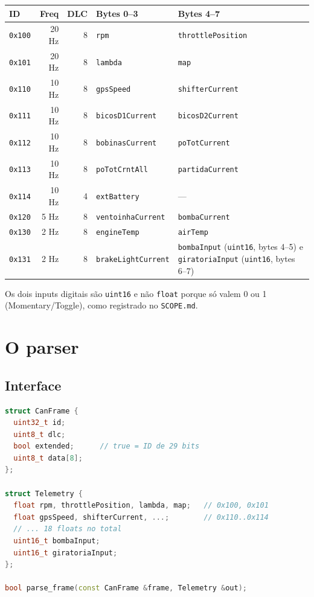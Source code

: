 \documentclass[11pt,a4paper]{article}
\begin{document}
\begin{center}
\small
\begin{tabularx}{\textwidth}{lrrXX}
\toprule
\textbf{ID} & \textbf{Freq} & \textbf{DLC} & \textbf{Bytes 0--3} & \textbf{Bytes 4--7} \\
\midrule
\texttt{0x100} & 20 Hz & 8 & \texttt{rpm} & \texttt{throttlePosition} \\
\texttt{0x101} & 20 Hz & 8 & \texttt{lambda} & \texttt{map} \\
\texttt{0x110} & 10 Hz & 8 & \texttt{gpsSpeed} & \texttt{shifterCurrent} \\
\texttt{0x111} & 10 Hz & 8 & \texttt{bicosD1Current} & \texttt{bicosD2Current} \\
\texttt{0x112} & 10 Hz & 8 & \texttt{bobinasCurrent} & \texttt{poTotCurrent} \\
\texttt{0x113} & 10 Hz & 8 & \texttt{poTotCrntAll} & \texttt{partidaCurrent} \\
\texttt{0x114} & 10 Hz & 4 & \texttt{extBattery} & --- \\
\texttt{0x120} & 5 Hz & 8 & \texttt{ventoinhaCurrent} & \texttt{bombaCurrent} \\
\texttt{0x130} & 2 Hz & 8 & \texttt{engineTemp} & \texttt{airTemp} \\
\texttt{0x131} & 2 Hz & 8 & \texttt{brakeLightCurrent} & \texttt{bombaInput} (\texttt{uint16}, bytes 4--5) e \texttt{giratoriaInput} (\texttt{uint16}, bytes 6--7) \\
\bottomrule
\end{tabularx}
\end{center}

Os dois inputs digitais são \texttt{uint16} e não \texttt{float} porque só valem 0 ou 1 (Momentary/Toggle), como registrado no \texttt{SCOPE.md}.

\section{O parser}

\subsection{Interface}

\begin{lstlisting}[language=C++,caption={firmware/lib/can\_parser/can\_parser.h (resumo)}]
struct CanFrame {
  uint32_t id;
  uint8_t dlc;
  bool extended;      // true = ID de 29 bits
  uint8_t data[8];
};

struct Telemetry {
  float rpm, throttlePosition, lambda, map;   // 0x100, 0x101
  float gpsSpeed, shifterCurrent, ...;        // 0x110..0x114
  // ... 18 floats no total
  uint16_t bombaInput;
  uint16_t giratoriaInput;
};

bool parse_frame(const CanFrame &frame, Telemetry &out);
\end{lstlisting}
\end{document}
